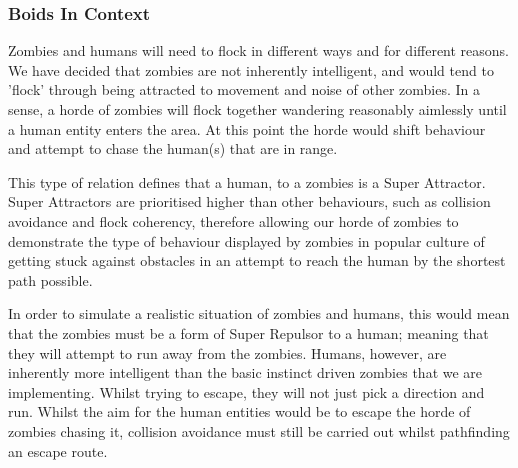 \subsubsection{Boids In Context}
Zombies and humans will need to flock in different ways and for different reasons. We have decided that zombies are not inherently intelligent, and would tend to 'flock' through being attracted to movement and noise of other zombies. In a sense, a horde of zombies will flock together wandering reasonably aimlessly until a human entity enters the area. At this point the horde would shift behaviour and attempt to chase the human(s) that are in range.

This type of relation defines that a human, to a zombies is a Super Attractor. Super Attractors are prioritised higher than other behaviours, such as collision avoidance and flock coherency, therefore allowing our horde of zombies to demonstrate the type of behaviour displayed by zombies in popular culture of getting stuck against obstacles in an attempt to reach the human by the shortest path possible.

In order to simulate a realistic situation of zombies and humans, this would mean that the zombies must be a form of Super Repulsor to a human; meaning that they will attempt to run away from the zombies. Humans, however, are inherently more intelligent than the basic instinct driven zombies that we are implementing. Whilst trying to escape, they will not just pick a direction and run. Whilst the aim for the human entities would be to escape the horde of zombies chasing it, collision avoidance must still be carried out whilst pathfinding an escape route.

\clearpage
\endinput

